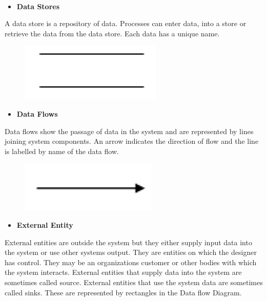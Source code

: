 \documentclass[12pt,a4paper,oneside]{report}
\begin{document}
  \\
  \begin{itemize}
  \item\textbf{Data Stores}
  \end{itemize}
\par A data store is a repository of data. Processes can enter data, into a store or retrieve the
data from the data store. Each data has a unique name.\\
\begin{figure}[h]
  	\begin{center}
  	
  	
  		\includegraphics[width=3 in,height=1 in]{process.png}
  			\end{center}
  \end{figure}
  
  \begin{itemize}
  \item\textbf{Data Flows}
  \end{itemize}
  \par Data flows show the passage of data in the system and are represented by lines joining
  system components. An arrow indicates the direction of flow and the line is labelled by
  name of the data flow.\\
  
  \begin{figure}[h]
    	\begin{center}
    	\includegraphics[width=3 in,height=1 in]{data.png}
    			\end{center}
    \end{figure}
 \newpage
 \begin{itemize}
 \item\textbf{External Entity}
 \end{itemize}
 \par External entities are outside the system but they either supply input data into the system or
 use other systems output. They are entities on which the designer has control. They may
 be an organizations customer or other bodies with which the system interacts. External
 entities that supply data into the system are sometimes called source. External entities that use the system data are sometimes called sinks. These are represented by rectangles
 in the Data flow Diagram.\\
 
\end{document}
